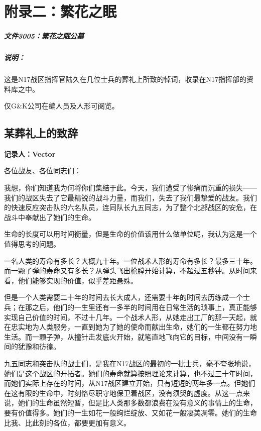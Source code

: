 \specialsectioning{}
\chapter{附录二：繁花之眠}

\paragraph*{文件3005：繁花之眠公墓} \mbox{}

\lineseparator

\paragraph*{说明：}

这是N17战区指挥官陆久在几位士兵的葬礼上所致的悼词，收录在N17指挥部的资料库之中。

仅G\&K公司在编人员及人形可阅览。

\lineseparator

\section*{某葬礼上的致辞}
\noindent \textbf{记录人：Vector}

各位战友、各位同志们：

我想，你们知道我为何将你们集结于此。今天，我们遭受了惨痛而沉重的损失——我们的战区失去了它最精锐的战斗力量，而我们，失去了我们最挚爱的战友。我们的快速反应突击队的六名队员，连同队长九五同志，为了整个北部战区的安危，在战斗中奉献出了她们的生命。

生命的长度可以用时间衡量，但是生命的价值该用什么做单位呢，我认为这是一个值得思考的问题。

一名人类的寿命有多长？大概九十年。一位战术人形的寿命有多长？最多三十年。而一颗子弹的寿命又有多长？从弹头飞出枪膛开始计算，不超过五秒钟。从时间来看，他们能够实现的价值，似乎差距悬殊。

但是一个人类需要二十年的时间去长大成人，还需要十年的时间去历练成一个士兵；在那之后，他们的一生里还有一多半的时间用在日常生活的琐事上，真正能够实现自己价值的时间，不过十几年。一个战术人形，从她走出工厂的那一天起，就在忠实地为人类服务，一直到她为了她的使命而献出生命，她们的一生都在努力地生活。而一颗子弹，从撞针击发底火开始，就笔直地飞向它的目标，中间没有一瞬间的犹豫和彷徨。

九五同志和突击队的战士们，是我在N17战区的最初的一批士兵，毫不夸张地说，她们是这个战区的开拓者。她们的寿命就算按照理论来计算，也不过三十年时间，而她们实际上存在的时间，从N17战区建立开始，只有短短的两年多一点。但她们在这有限的生命中，时刻恪尽职守地保卫着战区，没有须臾的虚度。从这一点来说，她们的生命虽然短暂，但是比人类那多数都浪费在没有意义的事情上的生命，要有价值得多。她们的一生如花一般绚烂绽放、又如花一般凄美凋零。她们的生命比我、比此刻的各位，都要更加有意义。

